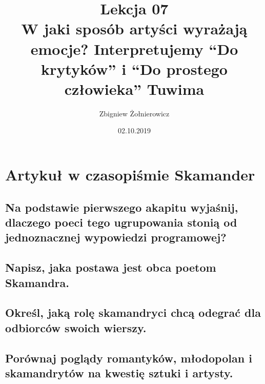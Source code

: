 \documentclass[a4paper]{article}
\begin{document}
\title{{\huge Lekcja 07} \\
{\large W jaki sposób artyści wyrażają emocje? Interpretujemy ``Do krytyków'' i ``Do prostego człowieka'' Tuwima}}
\author{Zbigniew Żołnierowicz}
\date{02.10.2019}
\maketitle
\section{Artykuł w czasopiśmie Skamander}
\subsection{Na podstawie pierwszego akapitu wyjaśnij, dla\-czego poeci tego ugrupowania stonią od jednoznacznej wy\-powiedzi programowej?}
\subsection{Napisz, jaka postawa jest obca poetom Skamandra.}
\subsection{Określ, jaką rolę skamandryci chcą odegrać dla odbiorców swoich wierszy.}
\subsection{Porównaj poglądy romantyków, młodopolan i \\ skamandrytów na kwestię sztuki i artysty.}
\begin{table}[H]
    \centering
\end{table}
\end{document}
